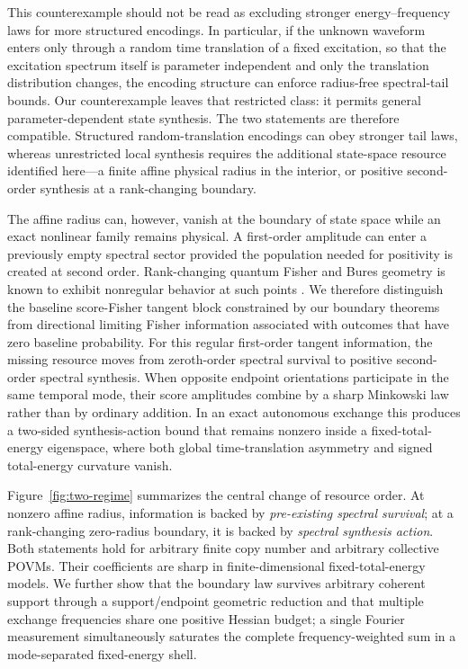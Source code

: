 This counterexample should not be read as excluding stronger energy--frequency laws for more structured encodings. In particular, if the unknown waveform enters only through a random time translation of a fixed excitation, so that the excitation spectrum itself is parameter independent and only the translation distribution changes, the encoding structure can enforce radius-free spectral-tail bounds. Our counterexample leaves that restricted class: it permits general parameter-dependent state synthesis. The two statements are therefore compatible. Structured random-translation encodings can obey stronger tail laws, whereas unrestricted local synthesis requires the additional state-space resource identified here---a finite affine physical radius in the interior, or positive second-order synthesis at a rank-changing boundary.

The affine radius can, however, vanish at the boundary of state space while an exact nonlinear family remains physical. A first-order amplitude can enter a previously empty spectral sector provided the population needed for positivity is created at second order. Rank-changing quantum Fisher and Bures geometry is known to exhibit nonregular behavior at such points \cite{Safranek2017}. We therefore distinguish the baseline score-Fisher tangent block constrained by our boundary theorems from directional limiting Fisher information associated with outcomes that have zero baseline probability. For this regular first-order tangent information, the missing resource moves from zeroth-order spectral survival to positive second-order spectral synthesis. When opposite endpoint orientations participate in the same temporal mode, their score amplitudes combine by a sharp Minkowski law rather than by ordinary addition. In an exact autonomous exchange this produces a two-sided synthesis-action bound that remains nonzero inside a fixed-total-energy eigenspace, where both global time-translation asymmetry and signed total-energy curvature vanish.

Figure~\ref{fig:two-regime} summarizes the central change of resource order. At nonzero affine radius, information is backed by \emph{pre-existing spectral survival}; at a rank-changing zero-radius boundary, it is backed by \emph{spectral synthesis action}. Both statements hold for arbitrary finite copy number and arbitrary collective POVMs. Their coefficients are sharp in finite-dimensional fixed-total-energy models. We further show that the boundary law survives arbitrary coherent support through a support/endpoint geometric reduction and that multiple exchange frequencies share one positive Hessian budget; a single Fourier measurement simultaneously saturates the complete frequency-weighted sum in a mode-separated fixed-energy shell.

